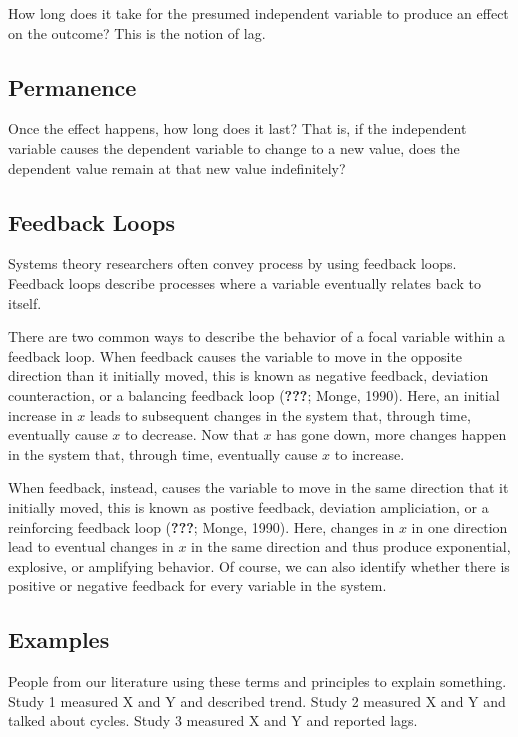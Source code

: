 \documentclass[english,,man]{apa6}
\theoremstyle{definition}
\theoremstyle{definition}
\theoremstyle{definition}
\theoremstyle{remark}
\begin{document}
How long does it take for the presumed independent variable to produce
an effect on the outcome? This is the notion of lag.

\hypertarget{permanence}{%
\subsection{Permanence}\label{permanence}}

Once the effect happens, how long does it last? That is, if the
independent variable causes the dependent variable to change to a new
value, does the dependent value remain at that new value indefinitely?

\hypertarget{feedback-loops}{%
\subsection{Feedback Loops}\label{feedback-loops}}

Systems theory researchers often convey process by using feedback loops.
Feedback loops describe processes where a variable eventually relates
back to itself.

There are two common ways to describe the behavior of a focal variable
within a feedback loop. When feedback causes the variable to move in the
opposite direction than it initially moved, this is known as negative
feedback, deviation counteraction, or a balancing feedback loop
({\textbf{???}}; Monge, 1990). Here, an initial increase in \(x\) leads
to subsequent changes in the system that, through time, eventually cause
\(x\) to decrease. Now that \(x\) has gone down, more changes happen in
the system that, through time, eventually cause \(x\) to increase.

When feedback, instead, causes the variable to move in the same
direction that it initially moved, this is known as postive feedback,
deviation ampliciation, or a reinforcing feedback loop ({\textbf{???}};
Monge, 1990). Here, changes in \(x\) in one direction lead to eventual
changes in \(x\) in the same direction and thus produce exponential,
explosive, or amplifying behavior. Of course, we can also identify
whether there is positive or negative feedback for every variable in the
system.

\hypertarget{examples}{%
\subsection{Examples}\label{examples}}

People from our literature using these terms and principles to explain
something. Study 1 measured X and Y and described trend. Study 2
measured X and Y and talked about cycles. Study 3 measured X and Y and
reported lags.
\end{document}
